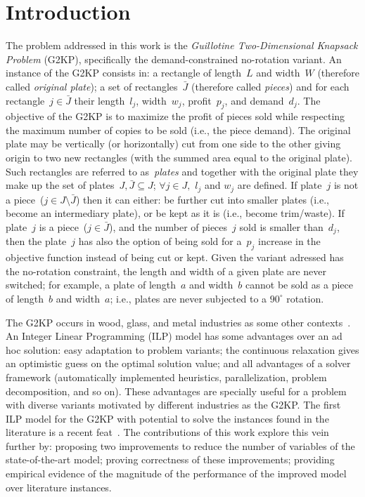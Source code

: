 \documentclass[runningheads]{llncs}
\begin{document}
 
\section{Introduction}

The problem addressed in this work is the \emph{Guillotine Two-Dimensional Knapsack Problem} (G2KP), specifically the demand-constrained no-rotation variant.
An instance of the G2KP consists in: a rectangle of length~\(L\) and width~\(W\) (therefore called \emph{original plate}); a set of rectangles~\(\bar{J}\) (therefore called \emph{pieces}) and for each rectangle~\(j \in \bar{J}\) their length~\(l_j\), width~\(w_j\), profit~\(p_j\), and demand~\(d_j\).
The objective of the G2KP is to maximize the profit of pieces sold while respecting the maximum number of copies to be sold (i.e., the piece demand).
The original plate may be vertically (or horizontally) cut from one side to the other giving origin to two new rectangles (with the summed area equal to the original plate).
Such rectangles are referred to as~\emph{plates} and together with the original plate they make up the set of plates~\(J, \bar{J} \subseteq J\); \(\forall j \in J, \) \(l_j\) and \(w_j\) are defined. 
If plate~\(j\) is not a piece~(\(j \in J\setminus\bar{J}\)) then it can either: be further cut into smaller plates (i.e., become an intermediary plate), or be kept as it is (i.e., become trim/waste).
If plate~\(j\) is a piece~(\(j \in \bar{J}\)), and the number of pieces~\(j\) sold is smaller than~\(d_j\), then the plate~\(j\) has also the option of being sold for a~\(p_j\) increase in the objective function instead of being cut or kept.
Given the variant adressed has the no-rotation constraint, the length and width of a given plate are never switched; for example, a plate of length~\(a\) and width~\(b\) cannot be sold as a piece of length~\(b\) and width~\(a\); i.e., plates are never subjected to a \(90^\circ\) rotation.

The G2KP occurs in wood, glass, and metal industries as some other contexts~\cite[p. 6]{dimitri_thesis}.
An Integer Linear Programming (ILP) model has some advantages over an ad hoc solution: easy adaptation to problem variants; the continuous relaxation gives an optimistic guess on the optimal solution value; and all advantages of a solver framework (automatically implemented heuristics, parallelization, problem decomposition, and so on).
These advantages are specially useful for a problem with diverse variants motivated by different industries as the G2KP.
The first ILP model for the G2KP with potential to solve the instances found in the literature is a recent feat~\cite{furini:2016}.
The contributions of this work explore this vein further by: proposing two improvements to reduce the number of variables of the state-of-the-art model; proving correctness of these improvements; providing empirical evidence of the magnitude of the performance of the improved model over literature instances.
\end{document}
